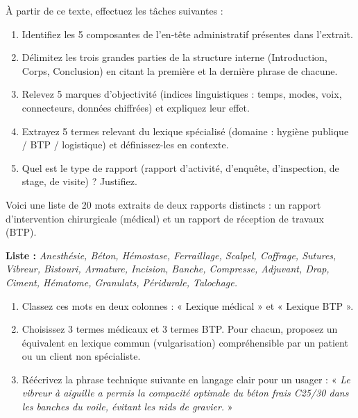 \documentclass[11pt]{article}
\begin{document}
\begin{exercice}
À partir de ce texte, effectuez les tâches suivantes :
\begin{enumerate}
\item Identifiez les 5 composantes de l'en-tête administratif présentes dans l'extrait.
\item Délimitez les trois grandes parties de la structure interne (Introduction, Corps, Conclusion) en citant la première et la dernière phrase de chacune.
\item Relevez 5 marques d'objectivité (indices linguistiques : temps, modes, voix, connecteurs, données chiffrées) et expliquez leur effet.
\item Extrayez 5 termes relevant du lexique spécialisé (domaine : hygiène publique / BTP / logistique) et définissez-les en contexte.
\item Quel est le type de rapport (rapport d'activité, d'enquête, d'inspection, de stage, de visite) ? Justifiez.
\end{enumerate}
\end{exercice}

\begin{exercice}
Voici une liste de 20 mots extraits de deux rapports distincts : un rapport d'intervention chirurgicale (médical) et un rapport de réception de travaux (BTP).

\textbf{Liste :} \emph{Anesthésie, Béton, Hémostase, Ferraillage, Scalpel, Coffrage, Sutures, Vibreur, Bistouri, Armature, Incision, Banche, Compresse, Adjuvant, Drap, Ciment, Hématome, Granulats, Péridurale, Talochage.}

\begin{enumerate}
\item Classez ces mots en deux colonnes : « Lexique médical » et « Lexique BTP ».
\item Choisissez 3 termes médicaux et 3 termes BTP. Pour chacun, proposez un équivalent en lexique commun (vulgarisation) compréhensible par un patient ou un client non spécialiste.
\item Réécrivez la phrase technique suivante en langage clair pour un usager : « \emph{Le vibreur à aiguille a permis la compacité optimale du béton frais C25/30 dans les banches du voile, évitant les nids de gravier.} »
\end{enumerate}
\end{exercice}
\end{document}
